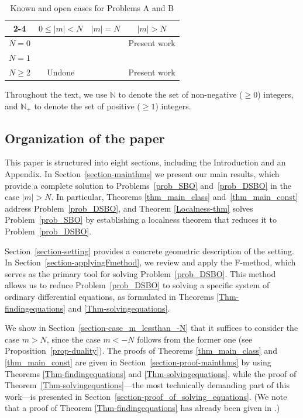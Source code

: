 \documentclass[12pt, pdflatex, a4paper]{article}
\theoremstyle{plain}
\theoremstyle{definition}
\def\N{{\mathbb N}}
\renewcommand*{\arraystretch}{0.8} %
\begin{document}

\begin{table}
\caption{Known and open cases for Problems A and B}
\label{table-cases}
\centering
\setlength{\tabcolsep}{15pt} %
\renewcommand{\arraystretch}{1.8} %
\fontsize{11pt}{11pt}\selectfont %
\begin{tabular}{| c | c | c | c |}
\cline{2-4}
\multicolumn{1}{c|}{}& $0 \leq |m| < N$ & $|m| = N$ & $|m| > N$\\[1ex]
\hline
$N = 0$ & \multicolumn{2}{c|}{\cite{Juh09, KOSS15}} & Present work\\
\hline
$N = 1$ & \cite{KKP16} & \multicolumn{2}{c|}{\cite{Per-Val23}}\\
\hline
$N \geq 2$ & Undone & \cite{Per-Val24} & Present work\\
\hline
\end{tabular}
\end{table}


Throughout the text, we use $\N$ to denote the set of non-negative ($\geq 0$) integers, and $\N_+$ to denote the set of positive ($\geq 1$) integers. 

\subsection{Organization of the paper}
This paper is structured into eight sections, including the Introduction and an Appendix. In Section~\ref{section-mainthms} we present our main results, which provide a complete solution to Problems~\ref{prob_SBO} and~\ref{prob_DSBO} in the case $|m| > N$. In particular, Theorems \ref{thm_main_class} and~\ref{thm_main_const} address Problem~\ref{prob_DSBO}, and Theorem \ref{Localness-thm} solves Problem~\ref{prob_SBO} by establishing a localness theorem that reduces it to Problem~\ref{prob_DSBO}.

Section~\ref{section-setting} provides a concrete geometric description of the setting. In Section~\ref{section-applyingFmethod}, we review and apply the F-method, which serves as the primary tool for solving Problem~\ref{prob_DSBO}. This method allows us to reduce Problem~\ref{prob_DSBO} to solving a specific system of ordinary differential equations, as formulated in Theorems \ref{Thm-findingequations} and \ref{Thm-solvingequations}.

We show in Section~\ref{section-case_m_lessthan_-N} that it suffices to consider the case $m > N$, since the case $m < -N$ follows from the former one (see Proposition~\ref{prop-duality}). 
The proofs of Theorems \ref{thm_main_class} and \ref{thm_main_const} are given in Section~\ref{section-proof-mainthms} by using Theorems \ref{Thm-findingequations} and \ref{Thm-solvingequations}, while the proof of Theorem~\ref{Thm-solvingequations}—the most technically demanding part of this work—is presented in Section~\ref{section-proof_of_solving_equations}. (We note that a proof of Theorem \ref{Thm-findingequations} has already been given in \cite{Per-Val24}.)
\end{document}
